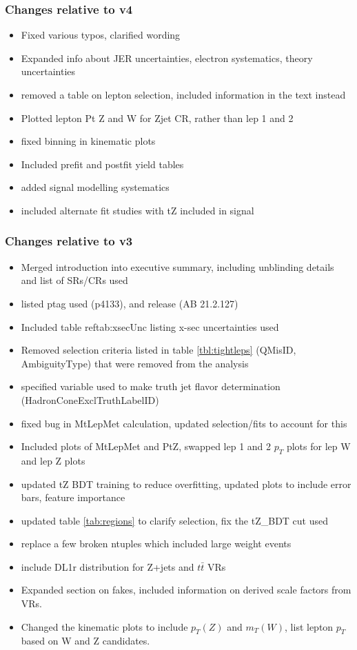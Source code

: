 \documentclass[NOTE, atlasdraft=true, texlive=2016, UKenglish]{\ATLASLATEXPATH atlasdoc}
\begin{document}
\subsubsection{Changes relative to v4}
\begin{itemize}
  \item Fixed various typos, clarified wording
  \item Expanded info about JER uncertainties, electron systematics, theory uncertainties
  \item removed a table on lepton selection, included information in the text instead
  \item Plotted lepton Pt Z and W for Zjet CR, rather than lep 1 and 2
  \item fixed binning in kinematic plots
  \item Included prefit and postfit yield tables
  \item added signal modelling systematics
  \item included alternate fit studies with tZ included in signal
\end{itemize}

\subsubsection{Changes relative to v3}
\begin{itemize}
  \item Merged introduction into executive summary, including unblinding details and list of SRs/CRs used
  \item listed ptag used (p4133), and release (AB 21.2.127)
  \item Included table ref{tab:xsecUnc} listing x-sec uncertainties used
  \item Removed selection criteria listed in table \ref{tbl:tightleps} (QMisID, AmbiguityType) that were removed from the analysis
  \item specified variable used to make truth jet flavor determination (HadronConeExclTruthLabelID)
  \item fixed bug in MtLepMet calculation, updated selection/fits to account for this
  \item Included plots of MtLepMet and PtZ, swapped lep 1 and 2 $p_T$ plots for lep W and lep Z plots
  \item updated tZ BDT training to reduce overfitting, updated plots to include error bars, feature importance
  \item updated table \ref{tab:regions} to clarify selection, fix the tZ\_BDT cut used
  \item replace a few broken ntuples which included large weight events
  \item include DL1r distribution for Z+jets and $t\bar{t}$ VRs
  \item Expanded section on fakes, included information on derived scale factors from VRs.
  \item Changed the kinematic plots to include $p_T(Z)$ and $m_T(W)$, list lepton $p_T$ based on W and Z candidates.
\end{itemize}
\end{document}
